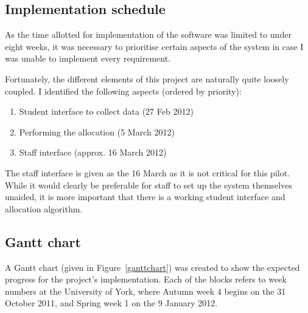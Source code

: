 
\subsection{Implementation schedule}

As the time allotted for implementation of the software was limited to under
eight weeks, it was necessary to prioritise certain aspects of the system in
case I was unable to implement every requirement.

Fortunately, the different elements of this project are naturally quite
loosely coupled. I identified the following aspects (ordered by priority):

\begin{enumerate}
  \item Student interface to collect data (27 Feb 2012)
  \item Performing the allocation (5 March 2012)
  \item Staff interface (approx. 16 March 2012)
\end{enumerate}

The staff interface is given as the 16 March as it is not critical for this
pilot. While it would clearly be preferable for staff to set up the system
themselves unaided, it is more important that there is a working student
interface and allocation algorithm.


\subsection{Gantt chart}

A Gantt chart (given in Figure~\ref{ganttchart}) was created to show the
expected progress for the project's implementation. Each of the blocks refers
to week numbers at the University of York, where Autumn week 4 begins on the
31 October 2011, and Spring week 1 on the 9 January 2012.


